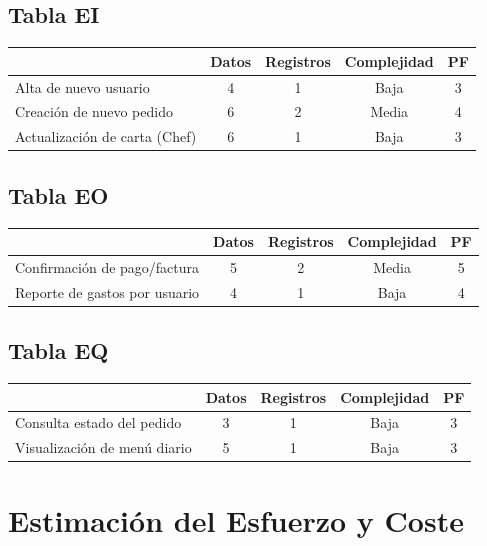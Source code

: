 \documentclass[12pt,a4paper]{article}
\begin{document}
\subsection{Tabla EI}
\begin{table}[H]
\centering
\begin{tabular}{lcccc}
\toprule
\textbf{} & \textbf{Datos} & \textbf{Registros} & \textbf{Complejidad} & \textbf{PF} \\
\midrule
Alta de nuevo usuario & 4 & 1 & Baja & 3 \\
Creación de nuevo pedido & 6 & 2 & Media & 4 \\
Actualización de carta (Chef) & 6 & 1 & Baja & 3 \\
\bottomrule
\end{tabular}
\end{table}


\subsection{Tabla EO}
\begin{table}[H]
\centering
\begin{tabular}{lcccc}
\toprule
\textbf{} & \textbf{Datos} & \textbf{Registros} & \textbf{Complejidad} & \textbf{PF} \\
\midrule
Confirmación de pago/factura & 5 & 2 & Media & 5 \\
Reporte de gastos por usuario & 4 & 1 & Baja & 4 \\
\bottomrule
\end{tabular}
\end{table}

\subsection{Tabla EQ}
\begin{table}[H]
\centering
\begin{tabular}{lcccc}
\toprule
\textbf{} & \textbf{Datos} & \textbf{Registros} & \textbf{Complejidad} & \textbf{PF} \\
\midrule
Consulta estado del pedido & 3 & 1 & Baja & 3 \\
Visualización de menú diario & 5 & 1 & Baja & 3 \\
\bottomrule
\end{tabular}
\end{table}

\section{Estimación del Esfuerzo y Coste}
\end{document}
